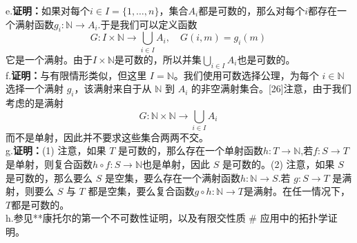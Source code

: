 {e.\textbf{证明：}如果对每个$i \in I = \{1, \dots , n\}$，集合$A_i$都是可数的，那么对每个$i$都存在一个满射函数$g_i : \mathbb{N} \to A_i$.于是我们可以定义函数
$$
G : I \times \mathbb{N} \to \bigcup_{i \in I} A_i, \quad G(i,m) = g_i(m)~
$$
它是一个满射。由于$I \times \mathbb{N}$是可数的，所以并集$\bigcup_{i \in I} A_i$也是可数的。\\
f.\textbf{证明：}与有限情形类似，但这里 $I = \mathbb{N}$。我们使用可数选择公理，为每个 $i \in \mathbb{N}$ 选择一个满射 $g_i$，该满射来自于从 $\mathbb{N}$ 到 $A_i$ 的非空满射集合。[26]注意，由于我们考虑的是满射
$$
G : \mathbb{N} \times \mathbb{N} \to \bigcup_{i \in I} A_i~
$$
而不是单射，因此并不要求这些集合两两不交。\\
g.\textbf{证明：}(1) 注意，如果 $T$ 是可数的，那么存在一个单射函数$h : T \to \mathbb{N}$,若$f : S \to T$是单射，则复合函数$h \circ f : S \to \mathbb{N}$也是单射，因此 $S$ 是可数的。(2) 注意，如果 $S$ 是可数的，那么要么 $S$ 是空集，要么存在一个满射函数$h : \mathbb{N} \to S$.若 $g : S \to T$ 是满射，则要么 $S$ 与 $T$ 都是空集，要么复合函数$g \circ h : \mathbb{N} \to T$是满射。在任一情况下，$T$都是可数的。\\
h.参见**康托尔的第一个不可数性证明，以及有限交性质 # 应用中的拓扑学证明。
}
